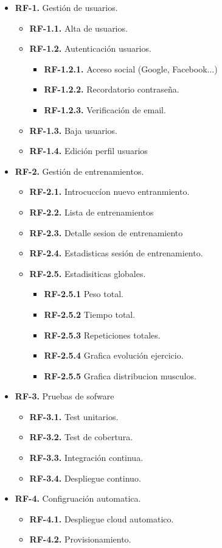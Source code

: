 \begin{itemize}
  \item \textbf{RF-1.} Gestión de usuarios.
  \begin{itemize}
    \item \textbf{RF-1.1.} Alta de usuarios.
    \item \textbf{RF-1.2.} Autenticación usuarios.
    \begin{itemize}
      \item \textbf{RF-1.2.1.} Acceso social (Google, Facebook...)
      \item \textbf{RF-1.2.2.} Recordatorio contraseña.
      \item \textbf{RF-1.2.3.} Verificación de email.
    \end{itemize}
    \item \textbf{RF-1.3.} Baja usuarios.
    \item \textbf{RF-1.4.} Edición perfil usuarios
  \end{itemize}
  \item \textbf{RF-2.} Gestión de entrenamientos.
  \begin{itemize}
    \item \textbf{RF-2.1.} Introcuccíon nuevo entranmiento.
    \item \textbf{RF-2.2.} Lista de entrenamientos
    \item \textbf{RF-2.3.} Detalle sesion de entrenamiento
    \item \textbf{RF-2.4.} Estadisticas sesión de entrenamiento.
    \item \textbf{RF-2.5.} Estadisiticas globales.
    \begin{itemize}
      \item \textbf{RF-2.5.1} Peso total.
      \item \textbf{RF-2.5.2} Tiempo total.
      \item \textbf{RF-2.5.3} Repeticiones totales.
      \item \textbf{RF-2.5.4} Grafica evolución ejercicio.
      \item \textbf{RF-2.5.5} Grafica distribucion musculos.
    \end{itemize}
  \end{itemize}
  \item \textbf{RF-3.} Pruebas de sofware
  \begin{itemize}
    \item \textbf{RF-3.1.} Test unitarios.
    \item \textbf{RF-3.2.} Test de cobertura.
    \item \textbf{RF-3.3.} Integración continua.
    \item \textbf{RF-3.4.} Despliegue continuo.
  \end{itemize}
  \item \textbf{RF-4.} Configruación automatica.
  \begin{itemize}
    \item \textbf{RF-4.1.} Despliegue cloud automatico.
    \item \textbf{RF-4.2.} Provisionamiento.
  \end{itemize}
\end{itemize}

